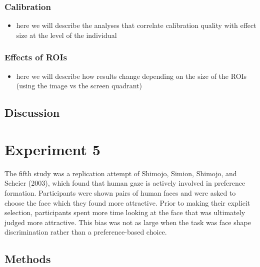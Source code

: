 \documentclass[
  english,
  man,floatsintext]{apa6}
\providecommand{\tightlist}{%
  \setlength{\itemsep}{0pt}\setlength{\parskip}{0pt}}
\begin{document}
\hypertarget{calibration-2}{%
\subsubsection{Calibration}\label{calibration-2}}

\begin{itemize}
\tightlist
\item
  here we will describe the analyses that correlate calibration quality with effect size at the level of the individual
\end{itemize}

\hypertarget{effects-of-rois}{%
\subsubsection{Effects of ROIs}\label{effects-of-rois}}

\begin{itemize}
\tightlist
\item
  here we will describe how results change depending on the size of the ROIs (using the image vs the screen quadrant)
\end{itemize}

\hypertarget{discussion-3}{%
\subsection{Discussion}\label{discussion-3}}

\hypertarget{experiment-5}{%
\section{Experiment 5}\label{experiment-5}}

The fifth study was a replication attempt of Shimojo, Simion, Shimojo, and Scheier (2003), which found that human gaze is actively involved in preference formation. Participants were shown pairs of human faces and were asked to choose the face which they found more attractive. Prior to making their explicit selection, participants spent more time looking at the face that was ultimately judged more attractive. This bias was not as large when the task was face shape discrimination rather than a preference-based choice.

\hypertarget{methods-4}{%
\subsection{Methods}\label{methods-4}}
\end{document}
